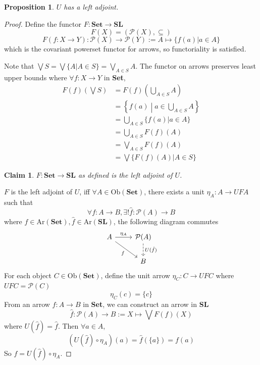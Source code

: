 \documentclass[11pt]{article} %
\newtheorem{proposition}[theorem]{Proposition}
\newtheorem{claim}[theorem]{Claim}
\theoremstyle{definition}
\theoremstyle{definition}
\theoremstyle{definition}
\begin{document}
\begin{proposition}
  $U$ has a left adjoint.
\end{proposition}
\begin{proof}
Define the functor $F:\textbf{Set} \rightarrow \textbf{SL}$
\[F(X) = (\mathcal{P}(X), \subseteq)\]
\[F(f: X\rightarrow Y) : \mathcal{P}(X) \rightarrow \mathcal{P}(Y) := A \mapsto \{f(a) | a\in A\}\]
which is the covariant powerset functor for arrows, so functoriality is satisfied.

Note that $\bigvee S = \bigvee \{A | A\in S\} = \bigvee_{A\in S} A$.
The functor on arrows preserves least upper bounds where $\forall f:X\rightarrow Y$ in \textbf{Set},
\begin{equation}
\begin{aligned}
  F(f)\left(\bigvee S\right) &= F(f)\left(\bigcup_{A\in S} A\right)\\
  &= \left\{f(a) \middle| a \in \bigcup_{A\in S} A\right\}\\
  &= \bigcup_{A\in S} \{f(a) | a \in A\}\\
  &= \bigcup_{A\in S} F(f)(A)\\
  &= \bigvee_{A\in S} F(f)(A)\\
  &= \bigvee \{ F(f)(A) | A\in S\}
\end{aligned}
\end{equation}

\begin{claim}
  $F:\textbf{Set} \rightarrow \textbf{SL}$ as defined is the left adjoint of $U$.
\end{claim}
$F$ is the left adjoint of $U$, iff $\forall A\in\text{Ob}(\textbf{Set})$,
there exists a unit $\eta_A : A\rightarrow UFA$ such that 
\[\forall f: A\rightarrow B,\exists! \hat{f}:\mathcal{P}(A) \rightarrow B\]
where $f\in\text{Ar}(\textbf{Set}),\hat{f}\in\text{Ar}(\textbf{SL})$, the following diagram commutes
\[\begin{tikzcd}
	A & {\mathcal{P}(A)} \\
	& B
	\arrow["{\eta_A}", from=1-1, to=1-2]
	\arrow["{U(\hat{f})}", dashed, from=1-2, to=2-2]
	\arrow["f"', from=1-1, to=2-2]
\end{tikzcd}\]
For each object $C\in\text{Ob}(\textbf{Set})$, define the unit arrow $\eta_C : C\rightarrow UFC$
where $UFC=\mathcal{P}(C)$
\[\eta_C(c) = \{c\}\]
From an arrow $f:A\rightarrow B$ in \textbf{Set}, we can construct an arrow in \textbf{SL}
\[\hat{f} : \mathcal{P}(A) \rightarrow B := X \mapsto \bigvee F(f)(X)\]
where $U(\hat{f}) = \hat{f}$.
Then $\forall a\in A$,
\[(U(\hat{f}) \circ \eta_A) (a) = \hat{f} (\{a\}) = f(a)\]
So $f = U(\hat{f}) \circ \eta_A$.


\end{proof}
\end{document}
